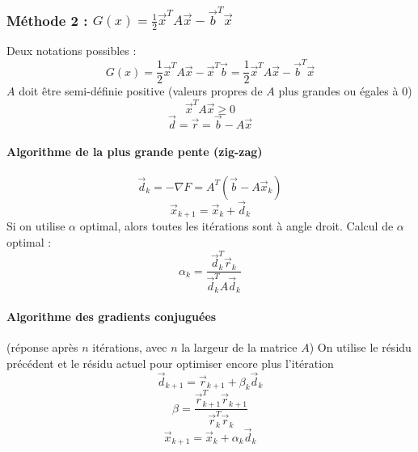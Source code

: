 \documentclass[resume]{subfiles}
\begin{document}
\subsubsection{Méthode 2 : $G(x)=\frac{1}{2}\vec{x}^TA\vec{x}-\vec{b}^T\vec{x}$}
Deux notations possibles :
$$G(x)=\frac{1}{2}\vec{x}^TA\vec{x}-\vec{x}^T\vec{b}=\frac{1}{2}\vec{x}^TA\vec{x}-\vec{b}^T\vec{x}$$
$A$ doit être semi-définie positive (valeurs propres de $A$ plus grandes ou égales à 0)
$$\vec{x}^TA\vec{x}\geq 0$$
$$\vec{d}=\vec{r}=\vec{b}-A\vec{x}$$
\paragraph{Algorithme de la plus grande pente (zig-zag)}
$$\vec{d}_k=-\nabla F=A^T(\vec{b}-A\vec{x}_k)$$
$$\vec{x}_{k+1}=\vec{x}_k+\vec{d}_k$$
Si on utilise $\alpha$ optimal, alors toutes les itérations sont à angle droit. Calcul de $\alpha$ optimal :
$$\alpha_k=\frac{\vec{d}_k^T\vec{r}_k}{\vec{d}^T_kA\vec{d}_k}$$
\paragraph{Algorithme des gradients conjuguées} (réponse après $n$ itérations, avec $n$ la largeur de la matrice $A$)
On utilise le résidu précédent et le résidu actuel pour optimiser encore plus l'itération
$$\vec{d}_{k+1}=\vec{r}_{k+1}+\beta_k\vec{d}_k$$
$$\beta=\frac{\vec{r}_{k+1}^T\vec{r}_{k+1}}{\vec{r}_k^T\vec{r}_k}$$
$$\vec{x}_{k+1}=\vec{x}_{k}+\alpha_k\vec{d}_k$$

    


    
\end{document}
